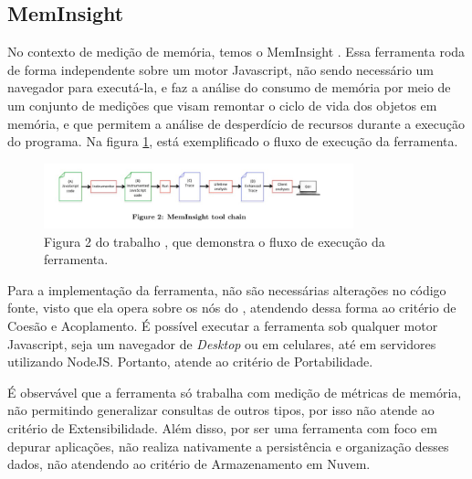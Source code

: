 \documentclass[12pt]{tcc}
\begin{document}
	\subsection{MemInsight}
	\label{subsection:meminsight}

	No contexto de medição de memória, temos o MemInsight \citep{Jensen2015MemInsight}. Essa ferramenta roda de forma independente sobre um motor Javascript, não sendo necessário um navegador para executá-la, e faz a análise do consumo de memória por meio de um conjunto de medições que visam remontar o ciclo de vida dos objetos em memória, e que permitem a análise de desperdício de recursos durante a execução do programa. Na figura \ref{fig:meminsight}, está exemplificado o fluxo de execução da ferramenta.

	\begin{figure}[!ht]
		\centering
		\includegraphics[width=0.8\textwidth]{figures/meminsight.jpeg}
		\caption{Figura 2 do trabalho \citep{Jensen2015MemInsight}, que demonstra o fluxo de execução da ferramenta. }
		\label{fig:meminsight}
	\end{figure}

	Para a implementação da ferramenta, não são necessárias alterações no código fonte, visto que ela opera sobre os nós do , atendendo dessa forma ao critério de Coesão e Acoplamento. É possível executar a ferramenta sob qualquer motor Javascript, seja um navegador de \emph{Desktop} ou em celulares, até em servidores utilizando NodeJS. Portanto, atende ao critério de Portabilidade.

	É observável que a ferramenta só trabalha com medição de métricas de memória, não permitindo generalizar consultas de outros tipos, por isso não atende ao critério de Extensibilidade. Além disso, por ser uma ferramenta com foco em depurar aplicações, não realiza nativamente a persistência e organização desses dados, não atendendo ao critério de Armazenamento em Nuvem.		
\end{document}
